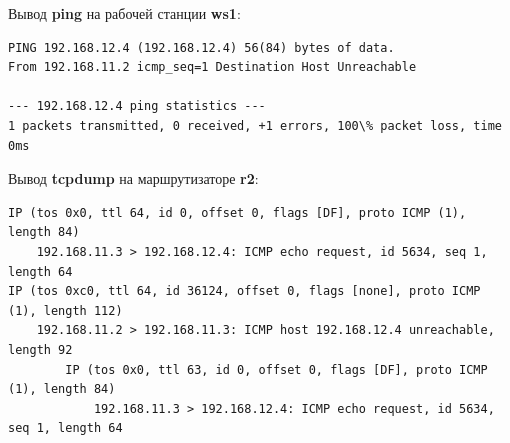 \documentclass[a4paper,12pt]{article}
\begin{document}
Вывод \textbf{ping} на рабочей станции \textbf{ws1}:

\begin{Verbatim}
PING 192.168.12.4 (192.168.12.4) 56(84) bytes of data.
From 192.168.11.2 icmp_seq=1 Destination Host Unreachable

--- 192.168.12.4 ping statistics ---
1 packets transmitted, 0 received, +1 errors, 100\% packet loss, time 0ms
\end{Verbatim}

Вывод \textbf{tcpdump} на маршрутизаторе \textbf{r2}:

\begin{Verbatim}
IP (tos 0x0, ttl 64, id 0, offset 0, flags [DF], proto ICMP (1), length 84)
    192.168.11.3 > 192.168.12.4: ICMP echo request, id 5634, seq 1, length 64
IP (tos 0xc0, ttl 64, id 36124, offset 0, flags [none], proto ICMP (1), length 112)
    192.168.11.2 > 192.168.11.3: ICMP host 192.168.12.4 unreachable, length 92
	    IP (tos 0x0, ttl 63, id 0, offset 0, flags [DF], proto ICMP (1), length 84)
	        192.168.11.3 > 192.168.12.4: ICMP echo request, id 5634, seq 1, length 64
\end{Verbatim}
\end{document}
